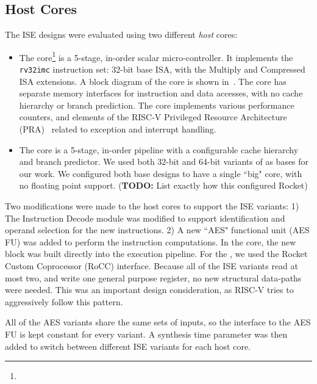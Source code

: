
\subsection{Host Cores}

The ISE designs were evaluated using two different {\em host} cores:

\begin{itemize}
\item
    The  core\footnote{%
}   is a 5-stage, in-order scalar micro-controller.
    It implements the
    {\tt rv32imc}
    instruction set: 32-bit base ISA, with the Multiply and Compressed
    ISA extensions.
    A block diagram of the core is shown in~.
    The core has separate memory interfaces for instruction and data
    accesses, with no cache hierarchy or branch prediction.
    The core implements various performance counters,
    and
    elements of the
    RISC-V Privileged Resource Architecture 
    (PRA)~\cite[Chapter 3]{RV:ISA:II:17}
    related to exception and interrupt handling.

\item
    The  core\cite{rocket:16} 
    is a 5-stage, in-order pipeline with a configurable cache hierarchy and
    branch predictor.
    We used both 32-bit and 64-bit variants of  as bases for our work.
    We configured both base designs to have a single ``big" core, with
    no floating point support.
    ({\bf TODO:} List exactly how this configured Rocket)

\end{itemize}

Two modifications were made to the host cores to support the ISE variants:
1) The Instruction Decode module was modified to support identification and
   operand selection for the new instructions. 
2) A new ``AES" functional unit (AES FU) was added to perform the instruction
   computations.
In the  core, the new block was built directly into the execution
pipeline.
For the , we used the Rocket Custom Coprocessor (RoCC)
interface.
Because all of the ISE variants read at most two,
and write one general purpose register, no new structural data-paths
were needed.
This was an important design consideration, as RISC-V tries to
aggressively follow this pattern.

All of the AES variants share the same sets of inputs, so the interface
to the AES FU is kept constant for every variant.
A synthesis time parameter was then added to switch between different
ISE variants for each host core.

